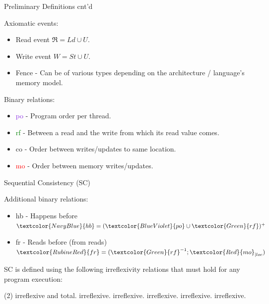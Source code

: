 \documentclass[xcolor={dvipsnames}, notes]{beamer}
\newcommand{\po}{\textcolor{BlueViolet}{po}}
\newcommand{\rf}{\textcolor{Green}{rf}}
\newcommand{\co}{\textcolor{BurntOrange}{co}}
\newcommand{\mo}{\textcolor{Red}{mo}}
\newcommand{\hb}{\textcolor{NavyBlue}{hb}}
\newcommand{\fr}{\textcolor{RubineRed}{fr}}
\begin{document}
    \begin{frame}{Preliminary Definitions cnt'd}
        
        Axiomatic events:
        \begin{itemize}
            \item Read event $\Re = Ld \cup U$.
            \item Write event $W = St \cup U$. 
            \item Fence - Can be of various types depending on the architecture / language's memory model.
        \end{itemize}

        Binary relations:
        \begin{itemize}
            \item {\po} - Program order per thread.
            \item {\rf} - Between a read and the write from which its read value comes.
            \item {\co} - Order between writes/updates to same location.
            \item {\mo} - Order between memory writes/updates.
        \end{itemize}

    \end{frame}

    
    \begin{frame}{Sequential Consistency (SC)}
        
        Additional binary relations:
        \begin{itemize}
            \item {\hb} - Happens before $ \hb = (\po \cup \rf)^{+} $
            \item {\fr} - Reads before (from reads) $ \fr = (\rf^{-1};\mo_{|loc}) $ 
        \end{itemize}

        SC is defined using the following irreflexivity relations that must hold for any program execution:
        \begin{tasks}(2)
            \task {\mo} irreflexive and total.
            \task {\hb} irreflexive.
            \task {\mo;\hb} irreflexive.
            \task {\fr;\hb} irreflexive.
            \task {\fr;\mo} irreflexive.
            \task {\fr;\mo;\hb} irreflexive.
        \end{tasks}

    \end{frame}
\end{document}

